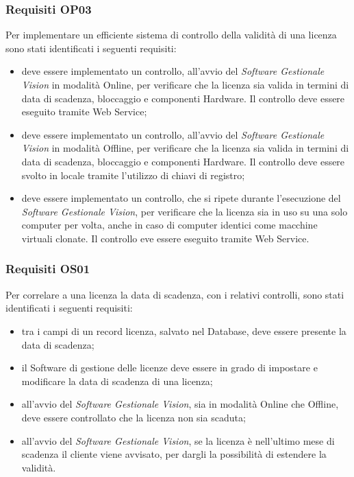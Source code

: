 \subsubsection{Requisiti OP03}

Per implementare un efficiente sistema di controllo della validità di una licenza sono stati identificati i seguenti requisiti:

\begin{itemize}
\item deve essere implementato un controllo, all'avvio del \textit{Software Gestionale Vision} in modalità Online, per verificare che la licenza sia valida in termini di data di scadenza, bloccaggio e componenti Hardware. Il controllo deve essere eseguito tramite Web Service; 
\item deve essere implementato un controllo, all'avvio del \textit{Software Gestionale Vision} in modalità Offline, per verificare che la licenza sia valida in termini di data di scadenza, bloccaggio e componenti Hardware. Il controllo deve essere svolto in locale tramite l'utilizzo di chiavi di registro;
\item deve essere implementato un controllo, che si ripete durante l'esecuzione del \textit{Software Gestionale Vision}, per verificare che la licenza sia in uso su una solo computer per volta, anche in caso di computer identici come macchine virtuali clonate. Il controllo eve essere eseguito tramite Web Service.
\end{itemize}

\subsubsection{Requisiti OS01}

Per correlare a una licenza la data di scadenza, con i relativi controlli, sono stati identificati i seguenti requisiti:

\begin{itemize}
\item tra i campi di un record licenza, salvato nel Database, deve essere presente la data di scadenza;
\item il Software di gestione delle licenze deve essere in grado di impostare e modificare la data di scadenza di una licenza;
\item all'avvio del \textit{Software Gestionale Vision}, sia in modalità Online che Offline, deve essere controllato che la licenza non sia scaduta;
\item all'avvio del \textit{Software Gestionale Vision}, se la licenza è nell'ultimo mese di scadenza il cliente viene avvisato, per dargli la possibilità di estendere la validità.
\end{itemize}

